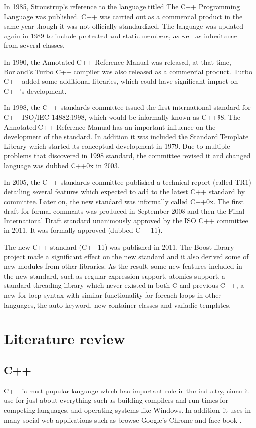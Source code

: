 \documentclass[12pt]{report}
\begin{document}
In 1985, Stroustrup's reference to the language titled The C++ Programming Language was published. C++ was carried out as a commercial product in the same year though it was not officially standardized. The language was updated again in 1989 to include protected and static members, as well as inheritance from several classes\cite{StroustrupHistory}.

In 1990, the Annotated C++ Reference Manual was released, at that time, Borland's Turbo C++ compiler was also released as a commercial product. Turbo C++ added some additional libraries, which could have significant impact on C++'s development\cite{StroustrupHistory}.

In 1998, the C++ standards committee issued the first international standard for C++ ISO/IEC 14882:1998, which would be informally known as C++98. The Annotated C++ Reference Manual has an important influence on the development of the standard.  In addition it was included the Standard Template Library which started its conceptual development in 1979. Due to multiple problems that discovered in 1998 standard, the committee revised it and changed language was dubbed C++0x in 2003\cite{CplusplusHistoryofCpp}.

In 2005, the C++ standards committee published a technical report (called TR1) detailing several features which expected to add to the latest C++ standard by committee. Later on, the new standard was informally called C++0x.  The first draft for formal comments was produced in September 2008 and then the Final International Draft standard unanimously approved by the ISO C++ committee in 2011. It was formally approved (dubbed C++11)\cite{CplusplusHistoryofCpp}.

The new C++ standard (C++11) was published in 2011. The Boost library project made a significant effect on the new standard and it also derived some of new modules from other libraries. As the result, some new features included in the new standard, such as regular expression support, atomics support, a standard threading library which never existed in both C and previous C++, a new for loop syntax with similar functionality for foreach loops in other languages, the auto keyword, new container classes and variadic templates\cite{CplusplusHistoryofCpp}. 


\chapter{Literature review}

\section{C++}
\label{section: C++}
C++ is most popular language which has important role in the industry, since it use for just about everything such as building compilers and run-times for competing languages, and operating systems like Windows. In addition, it uses in many social web applications such as browse Google’s Chrome and face book \cite{ISO:2011:Cpplanguage}.
\end{document}

